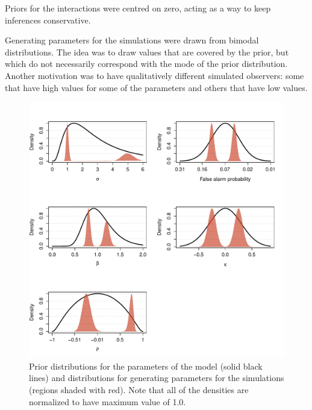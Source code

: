 \documentclass{article}\usepackage{knitr}
\begin{document}
Priors for the interactions were centred on zero, acting as a way to keep inferences conservative.

Generating parameters for the simulations were drawn from bimodal distributions. The idea was to draw values that are covered by the prior, but which do not necessarily correspond with the mode of the prior distribution. Another motivation was to have qualitatively different simulated observers: some that have high values for some of the parameters and others that have low values.

\begin{figure}[!htb]
\centering
\begin{knitrout}
\color{fgcolor}
\includegraphics[width=\maxwidth]{figure/unnamed-chunk-16-1} 
\end{knitrout}

\caption{Prior distributions for the parameters of the model (solid black lines) and distributions for generating parameters for the simulations (regions shaded with red). Note that all of the densities are normalized to have maximum value of 1.0.}
\label{fig:priors}
\end{figure}
\end{document}
